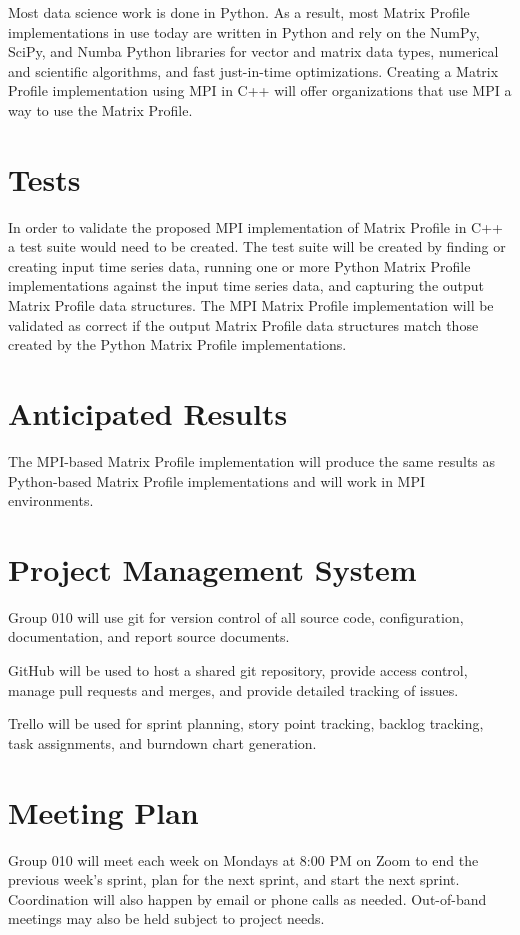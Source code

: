 \documentclass[conference]{IEEEtran}
\begin{document}
Most data science work is done in Python.  As a result, most Matrix Profile implementations in use today are written in Python \cite{Stumpy} and rely on the NumPy, SciPy, and Numba Python libraries for vector and matrix data types, numerical and scientific algorithms, and fast just-in-time optimizations.  Creating a Matrix Profile implementation using MPI in C++ will offer organizations that use MPI a way to use the Matrix Profile. 

\section{Tests}
In order to validate the proposed MPI implementation of Matrix Profile in C++ a test suite would need to be created.  The test suite will be created by finding or creating input time series data, running one or more Python Matrix Profile implementations against the input time series data, and capturing the output Matrix Profile data structures.  The MPI Matrix Profile implementation will be validated as correct if the output Matrix Profile data structures match those created by the Python Matrix Profile implementations. 

\section{Anticipated Results}
The MPI-based Matrix Profile implementation will produce the same results as Python-based Matrix Profile implementations and will work in MPI environments.

\section{Project Management System}
Group 010 will use git for version control of all source code, configuration, documentation, and report source documents.  

GitHub will be used to host a shared git repository, provide access control, manage pull requests and merges, and provide detailed tracking of issues.

Trello will be used for sprint planning, story point tracking, backlog tracking, task assignments, and burndown chart generation. 

\section{Meeting Plan}
Group 010 will meet each week on Mondays at 8:00 PM on Zoom to end the previous week's sprint, plan for the next sprint, and start the next sprint.  Coordination will also happen by email or phone calls as needed.  Out-of-band meetings may also be held subject to project needs.
\end{document}
